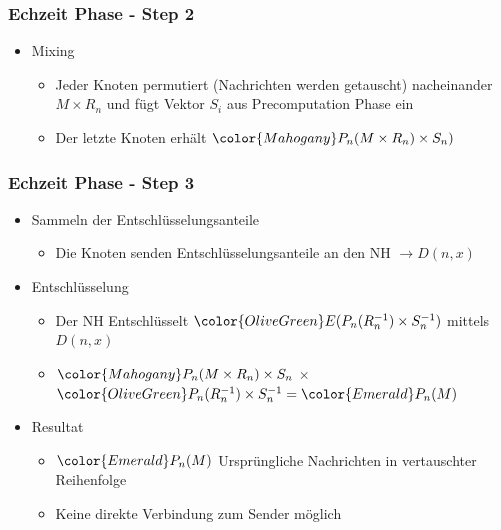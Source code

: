 \documentclass[t, xcolor=dvipsnames]{beamer}
\begin{document}
\begin{frame}
	\frametitle{Echzeit Phase - Step 2}
	\begin{itemize}
		\item Mixing
		\begin{itemize}
			\item Jeder Knoten permutiert (Nachrichten werden getauscht) nacheinander $M \times R_n$ und fügt Vektor $S_i$ aus Precomputation Phase ein
			\item Der letzte Knoten erhält  $\color{Mahogany}P_n(M \times R_n) \times S_n)$
		\end{itemize}
	\end{itemize}
	\vspace{\fill}
\end{frame}

\begin{frame}
	\frametitle{Echzeit Phase - Step 3}
	\begin{itemize}
		\item Sammeln der Entschlüsselungsanteile
			\begin{itemize}
				\item Die Knoten  senden Entschlüsselungsanteile an den NH $\rightarrow D(n, x)$
			\end{itemize}

		\item Entschlüsselung
		\begin{itemize}
				\item Der NH Entschlüsselt $\color{OliveGreen} E(P_n(R_n^{-1}) \times S_n^{-1})$ mittels $D(n,x)$
				\item $\color{Mahogany}P_n(M \times R_n) \times S_n$ $\times$ $\color{OliveGreen}P_n(R_n^{-1}) \times S_n^{-1} = \color{Emerald} P_n(M)$
		\end{itemize}

	
	
		\item Resultat
		\begin{itemize}
			\item $\color{Emerald} P_n(M)$ Ursprüngliche Nachrichten in vertauschter Reihenfolge
			\item Keine direkte Verbindung zum Sender möglich
		\end{itemize}
	\end{itemize}		
	\vspace{\fill}
\end{frame}
\end{document}
